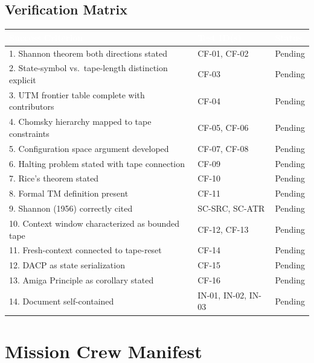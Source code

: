 \documentclass[11pt,letterpaper]{article}
\newcommand{\tableheader}[1]{\textbf{\sffamily\textcolor{white}{#1}}}
\begin{document}
\subsection{Verification Matrix}

\begin{center}
\begin{tabularx}{\textwidth}{XL{3.5cm}C{2cm}}
\toprule
{}
\tableheader{Success Criterion} & \tableheader{Test ID(s)} & \tableheader{Status} \\
. Shannon theorem both directions stated & CF-01, CF-02 & Pending \\
2. State-symbol vs.\ tape-length distinction explicit & CF-03 & Pending \\
3. UTM frontier table complete with contributors & CF-04 & Pending \\
4. Chomsky hierarchy mapped to tape constraints & CF-05, CF-06 & Pending \\
5. Configuration space argument developed & CF-07, CF-08 & Pending \\
6. Halting problem stated with tape connection & CF-09 & Pending \\
7. Rice's theorem stated & CF-10 & Pending \\
8. Formal TM definition present & CF-11 & Pending \\
9. Shannon (1956) correctly cited & SC-SRC, SC-ATR & Pending \\
10. Context window characterized as bounded tape & CF-12, CF-13 & Pending \\
11. Fresh-context connected to tape-reset & CF-14 & Pending \\
12. DACP as state serialization & CF-15 & Pending \\
13. Amiga Principle as corollary stated & CF-16 & Pending \\
14. Document self-contained & IN-01, IN-02, IN-03 & Pending \\
\bottomrule
\end{tabularx}
\end{center}

\section{Mission Crew Manifest}
\end{document}
